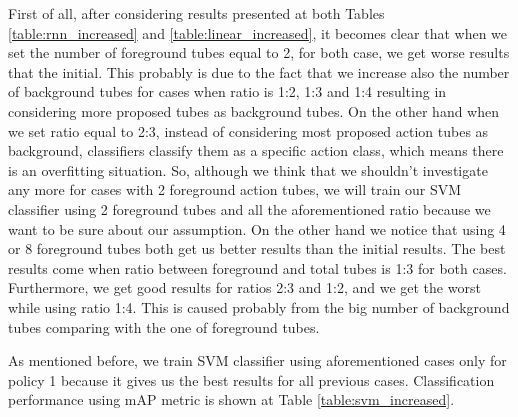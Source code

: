 First of all, after considering results presented at both Tables \ref{table:rnn_increased} and \ref{table:linear_increased}, it becomes clear that when we
set the number of foreground tubes equal to 2, for both case, we get worse results that the initial. This probably is due to the fact that we increase
also the number of background tubes for cases when ratio is 1:2, 1:3 and 1:4 resulting in considering more proposed tubes as background tubes. On the other
hand when we set ratio equal to 2:3, instead of considering most proposed action tubes as background, classifiers classify them as a specific action class,
which means there is an overfitting situation. So, although we think that we shouldn't investigate any more for cases with 2 foreground action tubes,
we will train our SVM classifier using 2 foreground tubes and all the aforementioned ratio because we want to be sure about our assumption. On the other hand
we notice that using 4 or 8 foreground tubes both  get us better results than the initial results. The best results come when  ratio between foreground and
total tubes is 1:3 for both cases. Furthermore, we get good results for ratios 2:3 and 1:2, and we get the worst while using ratio 1:4. This is caused probably
from the big number of background tubes comparing with the one of foreground tubes. \par 
As mentioned before, we train SVM classifier using aforementioned cases only for policy 1 because it gives us the best results for all previous cases.
Classification performance using mAP metric is shown at Table \ref{table:svm_increased}. 

